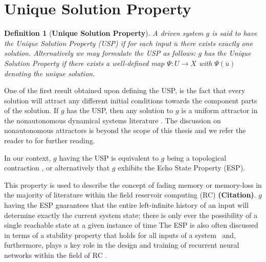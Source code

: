\documentclass[a4paper,12pt,twoside]{report}
\newtheorem{Definition}{Definition}[]
\begin{document}
\section {Unique Solution Property}

\begin{Definition}
  [\bf Unique Solution Property] \label{Dfn_usp}\rm
  A driven system $g$ is said to have the Unique Solution Property (USP) if for each input $\overline{u}$ there exists exactly one solution. 
  Alternatively we may formulate the USP as follows: $g$ has the Unique Solution Property if there exists a well-defined map $\Psi:{U}\to{X}$ with $\Psi({\overline{u}})$ denoting the unique solution.
\end{Definition}

One of the first result obtained upon defining the USP, is the fact that every solution will attract any different initial conditions towards the component parts of the solution. %
If $g$ has the USP, then any solution to $g$ is a uniform attractor in the nonautonomous dynamical systems literature \cite{Manju_Nonlinearity}. The discussion on nonautonomous attractors is beyond the scope of this thesis and we refer the reader to \cite{Manju_ESP, esann2012ids} for further reading. 

 In our context, $g$ having the USP is equivalent to $g$ being a topological contraction \cite{manjunath2021universal}, or alternatively that $g$ exhibits the Echo State Property (ESP). 

This property is used to describe the concept of fading memory or memory-loss in the majority of literature within the field reservoir computing (RC) \textbf{(Citation)}. 
$g$ having the ESP guarantees that the entire left-infinite history of an input will determine exactly the current system state; there is only ever the possibility of a single reachable state at a given instance of time \cite{jaeger2001echo}
The ESP is also often discussed in terms of a stability property that holds for all inputs of a system~\cite{manjunath2020stability} and, furthermore, plays a key role in the design and training of recurrent neural networks within the field of RC \cite{Manju_ESP}.
\end{document}
